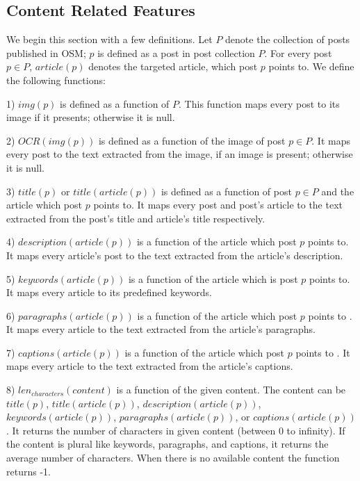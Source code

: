 \documentclass{sig-alternate}
\begin{document}
\subsection{Content Related Features}
\label{sec:content_related_features}

We begin this section with a few definitions.  
Let \(P\) denote the collection of posts published in OSM; \(p\) is defined as a post in post collection \(P\).
For every post \(p\in P\), \(article(p)\) denotes the targeted article, which post \(p\) points to.
We define the following functions:

1) \(img(p)\) is defined as a function of \(P\). 
This function maps every post to its image if it presents; otherwise it is null.
 
2) \(OCR(img(p))\) is defined as a function of the image of post \(p\in P\).
It maps every post to the text extracted from the image, if an image is present; otherwise it is null.
 
3) \(title(p)\) or \(title(article(p))\) is defined as a function of post \(p\in P\) and the article which post \(p\) points to.
It maps every post and post's article to the text extracted from the post's title and article's title respectively.

4) \(description(article(p))\) is a function of the article which post \(p\) points to.
It maps every article's post to the text extracted from the article's description.

5) \(keywords(article(p))\) is a function of the article which is post \(p\) points to.
It maps every article to its predefined keywords.

6) \(paragraphs(article(p))\) is a function of the article which post \(p\) points to .
It maps every article to the text extracted from the article's paragraphs.

7) \(captions(article(p))\) is a function of the article which post \(p\) points to .
It maps every article to the text extracted from the article's captions.

8) \(len_{characters}(content)\) is a function of the given content.
The content can be \(title(p)\), \(title(article(p))\), \(description(article(p))\), \(keywords(article(p))\), \(paragraphs(article(p))\), or \(captions(article(p))\).
It returns the number of characters in given content (between 0 to infinity).
If the content is plural like keywords, paragraphs, and captions, it returns the average number of characters. 
When there is no available content the function returns -1. 
\end{document}
